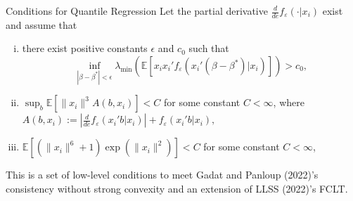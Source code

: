\documentclass[beamer, t]{beamer}
\begin{document}
\begin{frame}{Conditions for Quantile Regression}
	Let the partial derivative
	$\frac{d}{de}f_{\varepsilon}(\cdot|x_i)$ exist and assume that 
	\begin{enumerate}[(i)]	
		
		
		\item
		there exist positive constants $\epsilon$ and $c_0$ such that 
		$$
		\inf_{  | \beta-\beta^* |<\epsilon }\lambda_{\min} \left(  \mathbb E [x_ix_i'f_{\varepsilon}(x_i'(\beta-\beta^*)|x_i)] \right) > c_0,
		$$
		
		
		
		
		\item $\sup_b\mathbb E [ \|x_i\|^3A(b, x_i) ] <C$ for some constant $C < \infty$, where  $ A(b, x_i) :=   \left|\frac{d}{de}f_{\varepsilon}(x_i'b|x_i)\right| + f_{\varepsilon}(x_i'b|x_i),$ %
		
		
		\item $\mathbb E[ (\|x_i\|^6+1)\exp(\|x_i\|^2) ]<C$ for some constant $C < \infty$,
		
	\end{enumerate}
	
	\bigskip
	This is a set of low-level conditions to meet Gadat and Panloup (2022)'s consistency without strong convexity and an extension of LLSS (2022)'s FCLT. 
	
\end{frame}
\end{document}
